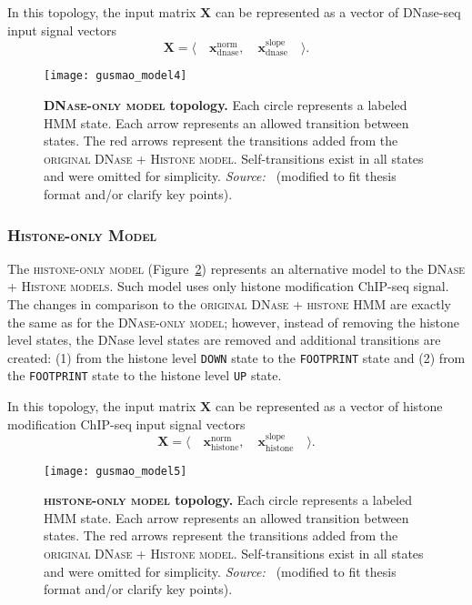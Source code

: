 In this topology, the input matrix $\mathbf{X}$ can be represented as a vector of DNase-seq input signal vectors
\begin{equation}
  \label{eq:signal.m4}
  \mathbf{X} = \langle \quad \mathbf{x}^{\text{norm}}_{\text{dnase}} ,\quad \mathbf{x}^{\text{slope}}_{\text{dnase}} \quad \rangle .
\end{equation}

\begin{figure}[h!]
\centering
\texttt{[image: gusmao\_model4]}
\caption[\textsc{DNase-only model} topology]{\textbf{\textsc{DNase-only model} topology.} Each circle represents a labeled HMM state. Each arrow represents an allowed transition between states. The red arrows represent the transitions added from the \textsc{original DNase + Histone model}. Self-transitions exist in all states and were omitted for simplicity. \emph{Source:~\cite{gusmao2014}} (modified to fit thesis format and/or clarify key points).}
\label{fig:gusmao_model4}
\end{figure}

\subsubsection{\textsc{Histone-only Model}}

The \textsc{histone-only model} (Figure~\ref{fig:gusmao_model5}) represents an alternative model to the \textsc{DNase + Histone models}. Such model uses only histone modification ChIP-seq signal. The changes in comparison to the \textsc{original DNase + histone} HMM are exactly the same as for the \textsc{DNase-only model}; however, instead of removing the histone level states, the DNase level states are removed and additional transitions are created: (1) from the histone level {\tt DOWN} state to the {\tt FOOTPRINT} state and (2) from the {\tt FOOTPRINT} state to the histone level {\tt UP} state.

In this topology, the input matrix $\mathbf{X}$ can be represented as a vector of histone modification ChIP-seq input signal vectors
\begin{equation}
  \label{eq:signal.m5}
  \mathbf{X} = \langle \quad \mathbf{x}^{\text{norm}}_{\text{histone}} ,\quad \mathbf{x}^{\text{slope}}_{\text{histone}} \quad \rangle .
\end{equation}

\begin{figure}[h!]
\centering
\texttt{[image: gusmao\_model5]}
\caption[\textsc{histone-only model} topology]{\textbf{\textsc{histone-only model} topology.} Each circle represents a labeled HMM state. Each arrow represents an allowed transition between states. The red arrows represent the transitions added from the \textsc{original DNase + Histone model}. Self-transitions exist in all states and were omitted for simplicity. \emph{Source:~\cite{gusmao2014}} (modified to fit thesis format and/or clarify key points).}
\label{fig:gusmao_model5}
\end{figure}

